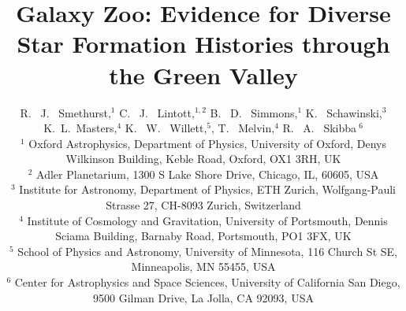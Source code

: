 \documentclass[useAMS,usenatbib]{mn2e}
\begin{document}
\title[The Star Formation History of the Green Valley]{Galaxy Zoo: Evidence for Diverse Star Formation Histories through the Green Valley}
\author[Smethurst et al. 2014]{R. ~J. ~Smethurst,$^1$ C. ~J. ~Lintott,$^{1,2}$ B. ~D. ~Simmons,$^{1}$ K. ~Schawinski,$^{3}$ \newauthor K.~L.~Masters,$^{4}$ K. ~W. ~Willett,$^{5}$, T. ~Melvin,$^{4}$ R. ~A. ~Skibba$~^{6}$
\\ $^1$ Oxford Astrophysics, Department of Physics, University of Oxford, Denys Wilkinson Building, Keble Road, Oxford, OX1 3RH, UK 
\\ $^2$ Adler Planetarium, 1300 S Lake Shore Drive, Chicago, IL, 60605, USA 
\\ $^3$ Institute for Astronomy, Department of Physics, ETH Zurich, Wolfgang-Pauli Strasse 27, CH-8093 Zurich, Switzerland 
\\ $^4$ Institute of Cosmology and Gravitation, University of Portsmouth, Dennis Sciama Building, Barnaby Road, Portsmouth, PO1 3FX, UK 
\\ $^5$ School of Physics and Astronomy, University of Minnesota, 116 Church St SE, Minneapolis, MN 55455, USA
\\ $^6$ Center for Astrophysics and Space Sciences, University of California San Diego, 9500 Gilman Drive, La Jolla, CA 92093, USA}

\maketitle
\end{document}
